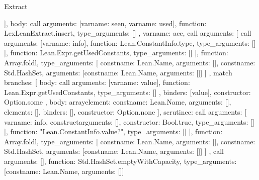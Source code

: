 \begin{lexlean}{Extract}
\begin{toolingmodule}
{{{{{{{{                        ],
                        body: call{
                          arguments: [var{name: seen}, var{name: used}],
                          function: LexLeanExtract.insert,
                          type_arguments: []
                        }
                      },
                      var{name: acc},
                      call{
                        arguments: [
                          call{
                            arguments: [var{name: info}],
                            function: Lean.ConstantInfo.type,
                            type_arguments: []
                          }
                        ],
                        function: Lean.Expr.getUsedConstants,
                        type_arguments: []
                      }
                    ],
                    function: Array.foldl,
                    type_arguments: [
                      const{name: Lean.Name, arguments: []},
                      const{name: Std.HashSet, arguments: [const{name: Lean.Name, arguments: []}]}
                    ]
                  },
                  match{
                    branches: [
                      {
                        body: call{
                          arguments: [var{name: value}],
                          function: Lean.Expr.getUsedConstants,
                          type_arguments: []
                        },
                        binders: [value],
                        constructor: Option.some
                      },
                      {
                        body: array{element: const{name: Lean.Name, arguments: []}, elements: []},
                        binders: [],
                        constructor: Option.none
                      }
                    ],
                    scrutinee: call{
                      arguments: [
                        var{name: info},
                        construct{arguments: [], constructor: Bool.true, type_arguments: []}
                      ],
                      function: "Lean.ConstantInfo.value?",
                      type_arguments: []
                    }
                  }
                ],
                function: Array.foldl,
                type_arguments: [
                  const{name: Lean.Name, arguments: []},
                  const{name: Std.HashSet, arguments: [const{name: Lean.Name, arguments: []}]}
                ]
              }
            }
          },
          call{
            arguments: [],
            function: Std.HashSet.emptyWithCapacity,
            type_arguments: [const{name: Lean.Name, arguments: []}]
}}}}
\end{toolingmodule}
\end{lexlean}
